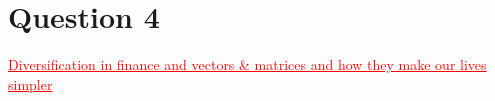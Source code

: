 \documentclass[12pt]{report}
\begin{document}


\newpage
\section*{Question 4}
\textcolor{red}{\underline{Diversification in finance and vectors \& matrices and how they make our lives simpler}}
\end{document}
